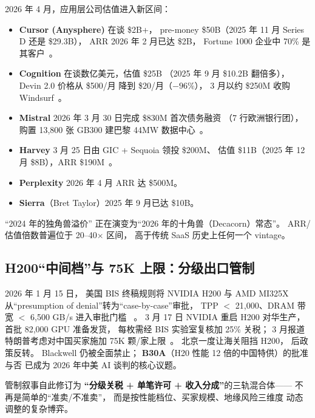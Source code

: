 2026 年 4 月，应用层公司估值进入新区间：

\begin{itemize}[noitemsep]
  \item \textbf{Cursor (Anysphere)} 在谈 \$2B+，
        pre-money \$50B（2025 年 11 月 Series D 还是 \$29.3B），
        ARR 2026 年 2 月已达 \$2B，
        Fortune 1000 企业中 70\% 是其客户~\cite{cursor_50b_round_2026}。
  \item \textbf{Cognition} 在谈数亿美元，估值 \$25B
        （2025 年 9 月 \$10.2B 翻倍多），
        Devin 2.0 价格从 \$500/月 降到 \$20/月（$-96\%$），
        3 月以约 \$250M 收购 Windsurf~\cite{cognition_25b_round_2026}。
  \item \textbf{Mistral} 2026 年 3 月 30 日完成 \$830M 首次债务融资
        （7 行欧洲银行团），
        购置 13,800 张 GB300 建巴黎 44MW 数据中心~\cite{mistral_debt_2026}。
  \item \textbf{Harvey} 3 月 25 日由 GIC + Sequoia 领投 \$200M、
        估值 \$11B（2025 年 12 月 \$8B），ARR \$190M~\cite{harvey_11b_round_2026}。
  \item \textbf{Perplexity} 2026 年 4 月 ARR 达 \$500M。
  \item \textbf{Sierra}（Bret Taylor）2025 年 9 月已达 \$10B。
\end{itemize}

“2024 年的独角兽溢价”
正在演变为“2026 年的十角兽（Decacorn）常态”。
ARR/估值倍数普遍位于 20--40$\times$ 区间，
高于传统 SaaS 历史上任何一个 vintage。

\subsection{H200“中间档”与 75K 上限：分级出口管制}

2026 年 1 月 15 日，
美国 BIS 终稿规则将 NVIDIA H200 与 AMD MI325X
从“presumption of denial”转为“case-by-case”审批，
TPP $<$ 21,000、DRAM 带宽 $<$ 6,500 GB/s 进入审批门槛%
~\cite{bis_h200_tiered_2026}。
3 月 17 日 NVIDIA 重启 H200 对华生产，
首批 82,000 GPU 准备发货，
每枚需经 BIS 实验室复核加 25\% 关税；
3 月报道特朗普考虑对中国买家施加 75K 颗/家上限~\cite{nvidia_h200_china_2026}。
北京一度让海关阻挡 H200，
后政策反转。
Blackwell 仍被全面禁止；
\textbf{B30A}（H20 性能 12 倍的中国特供）的批准与否
已成为 2026 年中美 AI 谈判的核心议题。

管制叙事自此修订为
\textbf{“分级关税 + 单笔许可 + 收入分成”}的三轨混合体——
不再是简单的“准卖/不准卖”，
而是按性能档位、买家规模、地缘风险三维度
动态调整的复杂博弈。

